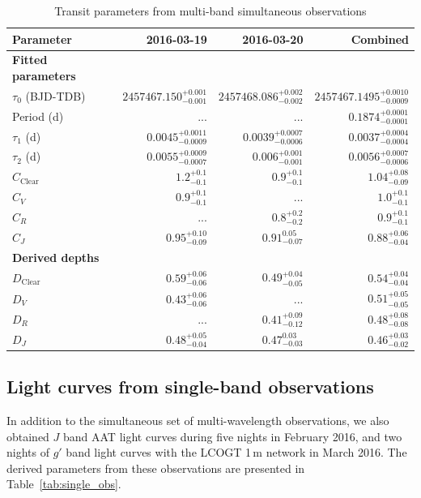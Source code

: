 \documentclass[iop,useAMES,usenatbig]{emulateapj}
\begin{document}
\begin{table}
\centering
\caption{\label{tab:simultaneous_params}Transit parameters from multi-band simultaneous observations}
\begin{tabular}{lrrr}
\hline\hline
Parameter & 2016-03-19 & 2016-03-20 & Combined\\
\hline
\textbf{Fitted parameters} & & & \\
$\tau_0$ (BJD-TDB) & $2457467.150_{-0.001}^{+0.001}$ & $2457468.086_{-0.002}^{+0.002}$ & $2457467.1495_{-0.0009}^{+0.0010}$\\
Period (d) & ... & ... & $0.1874_{-0.0001}^{+0.0001}$ \\ 
$\tau_1$ (d) & $0.0045_{-0.0009}^{+0.0011}$ & $0.0039_{-0.0006}^{+0.0007}$ & $0.0037_{-0.0004}^{+0.0004}$ \\
$\tau_2$ (d) & $0.0055_{-0.0007}^{+0.0009}$ & $0.006_{-0.001}^{+0.001}$ & $0.0056_{-0.0006}^{+0.0007}$ \\
$C_\mathrm{Clear}$ & $1.2_{-0.1}^{+0.1}$ & $0.9_{-0.1}^{+0.1}$ & $1.04_{-0.09}^{+0.08}$ \\
$C_V$ & $0.9_{-0.1}^{+0.1}$ & ... & $1.0_{-0.1}^{+0.1}$\\
$C_R$ & ... & $0.8_{-0.2}^{+0.2}$ & $0.9_{-0.1}^{+0.1}$ \\
$C_J$ & $0.95_{-0.09}^{+0.10}$ & $0.91_{-0.07}^{0.05}$ & $0.88_{-0.04}^{+0.06}$ \\
\textbf{Derived depths} && \\
$D_\mathrm{Clear}$ & $0.59_{-0.06}^{+0.06}$ & $0.49_{-0.05}^{+0.04}$ & $0.54_{-0.04}^{+0.04}$ \\
$D_V$ & $0.43_{-0.06}^{+0.06}$ & ... & $0.51_{-0.05}^{+0.05}$\\
$D_R$ & ... & $0.41_{-0.12}^{+0.09}$ & $0.48_{-0.08}^{+0.08}$\\
$D_J$ & $0.48_{-0.04}^{+0.05}$ & $0.47_{-0.03}^{0.03}$ & $0.46_{-0.02}^{+0.03}$\\
\hline
\end{tabular}
\end{table}

\subsection{Light curves from single-band observations}
\label{sec:single_band_lc}


In addition to the simultaneous set of multi-wavelength observations, we also obtained $J$ band AAT light curves during five nights in February 2016, and two nights of $g'$ band light curves with the LCOGT 1\,m network in March 2016. The derived parameters from these observations are presented in Table~\ref{tab:single_obs}. 
\end{document}
